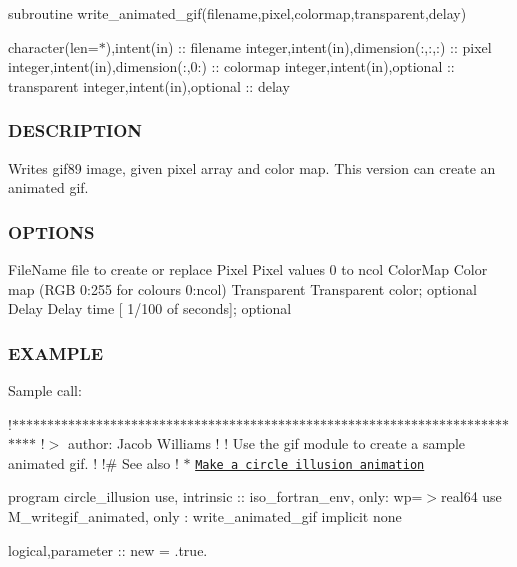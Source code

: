 subroutine write\+\_\+animated\+\_\+gif(filename,pixel,colormap,transparent,delay)

character(len=$\ast$),intent(in) \+:\+: filename integer,intent(in),dimension(\+:,\+:,\+:) \+:\+: pixel integer,intent(in),dimension(\+:,0\+:) \+:\+: colormap integer,intent(in),optional \+:\+: transparent integer,intent(in),optional \+:\+: delay

\subsubsection*{D\+E\+S\+C\+R\+I\+P\+T\+I\+ON}

Writes gif89 image, given pixel array and color map. This version can create an animated gif.

\subsubsection*{O\+P\+T\+I\+O\+NS}

File\+Name file to create or replace Pixel Pixel values 0 to ncol Color\+Map Color map (R\+GB 0\+:255 for colours 0\+:ncol) Transparent Transparent color; optional Delay Delay time \mbox{[} 1/100 of seconds\mbox{]}; optional

\subsubsection*{E\+X\+A\+M\+P\+LE}

Sample call\+:

!$\ast$$\ast$$\ast$$\ast$$\ast$$\ast$$\ast$$\ast$$\ast$$\ast$$\ast$$\ast$$\ast$$\ast$$\ast$$\ast$$\ast$$\ast$$\ast$$\ast$$\ast$$\ast$$\ast$$\ast$$\ast$$\ast$$\ast$$\ast$$\ast$$\ast$$\ast$$\ast$$\ast$$\ast$$\ast$$\ast$$\ast$$\ast$$\ast$$\ast$$\ast$$\ast$$\ast$$\ast$$\ast$$\ast$$\ast$$\ast$$\ast$$\ast$$\ast$$\ast$$\ast$$\ast$$\ast$$\ast$$\ast$$\ast$$\ast$$\ast$$\ast$$\ast$$\ast$$\ast$$\ast$$\ast$$\ast$$\ast$$\ast$$\ast$$\ast$$\ast$$\ast$$\ast$$\ast$ !$>$ author\+: Jacob Williams ! ! Use the gif module to create a sample animated gif. ! !\# See also ! $\ast$ \href{http://codegolf.stackexchange.com/questions/34887/make-a-circle-illusion-animation}{\tt Make a circle illusion animation}

program circle\+\_\+illusion use, intrinsic \+:\+: iso\+\_\+fortran\+\_\+env, only\+: wp=$>$real64 use M\+\_\+writegif\+\_\+animated, only \+: write\+\_\+animated\+\_\+gif implicit none

logical,parameter \+:\+: new = .true.

